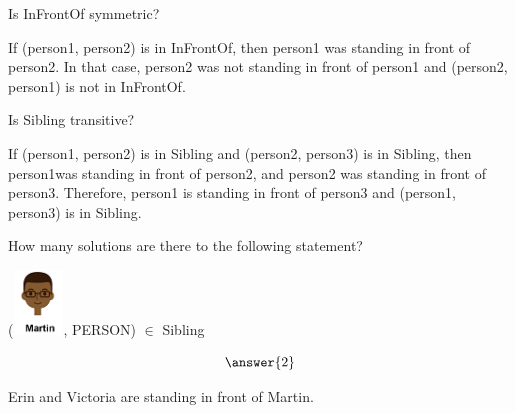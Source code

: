 \documentclass{ximera}
\begin{document}
\begin{exercise}
Is InFrontOf symmetric?

  \begin{multipleChoice}
  \end{multipleChoice}
  \begin{feedback}
  If (person1, person2) is in InFrontOf, then person1 was standing in front of person2.  In that case, person2 was not standing in front of person1 and (person2, person1) is not in InFrontOf.
  \end{feedback}
\end{exercise}





\begin{exercise}
Is Sibling transitive?

  \begin{multipleChoice}
  \end{multipleChoice}
  \begin{feedback}
If (person1, person2) is in Sibling and (person2, person3) is in Sibling, then person1was standing in front of person2, and person2 was standing in front of person3. Therefore, person1 is standing in front of person3 and (person1, person3) is in Sibling.
  \end{feedback}
\end{exercise}




\begin{exercise}
How many solutions are there to the following statement?  

({\includegraphics[width=50px,height=65px]{pics/people/martin.png}}, PERSON) $\in$ Sibling 

\[  \answer{2} \]

  \begin{feedback}
Erin and Victoria are standing in front of Martin.
  \end{feedback}
\end{exercise}
\end{document}
